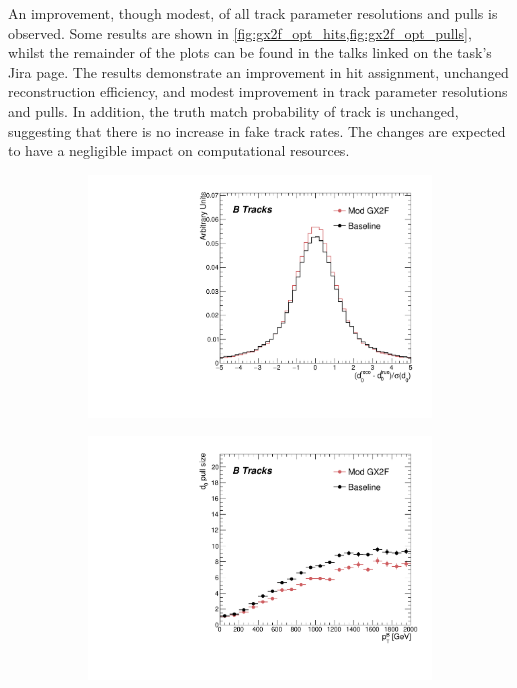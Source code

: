 %
An improvement, though modest, of all track parameter resolutions and pulls is observed. Some results are shown in \cref{fig:gx2f_opt_hits,fig:gx2f_opt_pulls}, whilst the remainder of the plots can be found in the talks linked on the task's Jira page. The results demonstrate an improvement in hit assignment, unchanged reconstruction efficiency, and modest improvement in track parameter resolutions and pulls. In addition, the truth match probability of track is unchanged, suggesting that there is no increase in fake track rates. The changes are expected to have a negligible impact on computational resources.

\begin{figure}[!htbp]
    \centering
    \begin{subfigure}{.48\textwidth}
      \centering
      \includegraphics[width=\textwidth]{chapters/3.tracking/figs/h_recoTruthPull_d0_From_B.pdf}
    \end{subfigure}%
    \begin{subfigure}{.48\textwidth}
      \centering
      \includegraphics[width=\textwidth]{chapters/3.tracking/figs/p_d0_pull_size_pTB_From_B.pdf}

\end{subfigure}
\end{figure}
